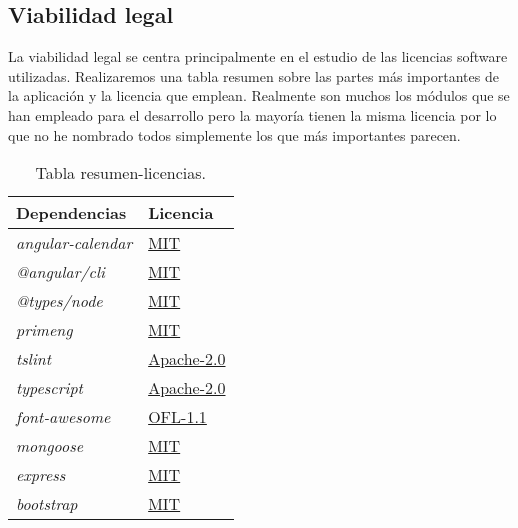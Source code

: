 \subsection{Viabilidad legal}\label{viabilidad-legal}
La viabilidad legal se centra principalmente en el estudio de las licencias software utilizadas. Realizaremos una tabla resumen sobre las partes más importantes de la aplicación y la licencia que emplean. Realmente son muchos los módulos que se han empleado para el desarrollo pero la mayoría tienen la misma licencia por lo que no he nombrado todos simplemente los que más importantes parecen. 

\begin{table}[H]
\begin{center}
\begin{tabular}{|l|l|}
\hline
Dependencias & Licencia \\
\hline \hline
\emph{angular-calendar} & \href{https://opensource.org/licenses/MIT}{MIT}\\ \hline
\emph{@angular/cli} & \href{https://opensource.org/licenses/MIT}{MIT}\\ \hline
\emph{@types/node} & \href{https://opensource.org/licenses/MIT}{MIT}\\ \hline
\emph{primeng} & \href{https://opensource.org/licenses/MIT}{MIT}\\ \hline
\emph{tslint} & \href{https://opensource.org/licenses/Apache-2.0}{Apache-2.0}\\ \hline
\emph{typescript} & \href{https://opensource.org/licenses/Apache-2.0}{Apache-2.0}\\ \hline
\emph{font-awesome} & \href{https://opensource.org/licenses/OFL-1.1}{OFL-1.1}\\ \hline
\emph{mongoose} & \href{https://opensource.org/licenses/MIT}{MIT}\\ \hline
\emph{express} & \href{https://opensource.org/licenses/MIT}{MIT}\\ \hline
\emph{bootstrap} & \href{https://opensource.org/licenses/MIT}{MIT}\\ \hline

\end{tabular}
\caption{Tabla resumen-licencias.}
\label{tabla:licencias}
\end{center}
\end{table}



